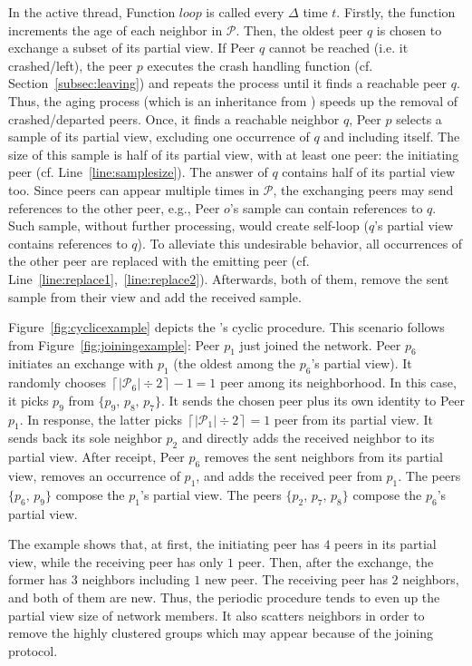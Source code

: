 In the active thread, Function $loop$ is called every $\Delta$ time
$t$. Firstly, the function increments the age of each neighbor in
$\mathcal{P}$. Then, the oldest peer $q$ is chosen to exchange a subset of its
partial view. If Peer $q$ cannot be reached (i.e. it crashed/left), the peer
$p$ executes the crash handling function (cf. Section~\ref{subsec:leaving}) and
repeats the process until it finds a reachable peer $q$. Thus, the aging
process (which is an inheritance from \CYCLON) speeds up the removal of
crashed/departed peers. Once, it finds a reachable neighbor $q$, Peer $p$
selects a sample of its partial view, excluding one occurrence of $q$ and
including itself. The size of this sample is half of its partial view, with at
least one peer: the initiating peer (cf. Line~\ref{line:samplesize}). The
answer of $q$ contains half of its partial view too. Since peers can appear
multiple times in $\mathcal{P}$, the exchanging peers may send references to
the other peer, e.g., Peer $o$'s sample can contain references to $q$. Such
sample, without further processing, would create self-loop ($q$'s partial view
contains references to $q$). To alleviate this undesirable behavior, all
occurrences of the other peer are replaced with the emitting peer
(cf. Line~\ref{line:replace1},~\ref{line:replace2}).  Afterwards, both of them,
remove the sent sample from their view and add the received sample.

Figure~\ref{fig:cyclicexample} depicts the \SPRAY's cyclic
procedure. This scenario follows from Figure~\ref{fig:joiningexample}:
Peer $p_1$ just joined the network. Peer $p_6$ initiates an exchange
with $p_1$ (the oldest among the $p_6$'s partial view). It randomly
chooses $\left\lceil{|\mathcal{P}_6|\div 2}\right\rceil-1 = 1$ peer
among its neighborhood. In this case, it picks $p_9$ from
$\{p_9,\,p_8,\,p_7\}$.  It sends the chosen peer plus its own identity
to Peer $p_1$. In response, the latter picks
$\left\lceil{|\mathcal{P}_1|\div 2}\right\rceil = 1$ peer from its
partial view. It sends back its sole neighbor $p_2$ and directly adds
the received neighbor to its partial view. After receipt, Peer $p_6$
removes the sent neighbors from its partial view, removes an
occurrence of $p_1$, and adds the received peer from $p_1$. The peers
$\{p_6,\,p_9\}$ compose the $p_1$'s partial view. The peers
$\{p_2,\,p_7,\,p_8\}$ compose the $p_6$'s partial view.

The example shows that, at first, the initiating peer has $4$ peers in
its partial view, while the receiving peer has only $1$ peer. Then,
after the exchange, the former has $3$ neighbors including $1$ new
peer. The receiving peer has $2$ neighbors, and both of them are
new. Thus, the periodic procedure tends to even up the partial view
size of network members. It also scatters neighbors in order to remove
the highly clustered groups which may appear because of the joining
protocol.

